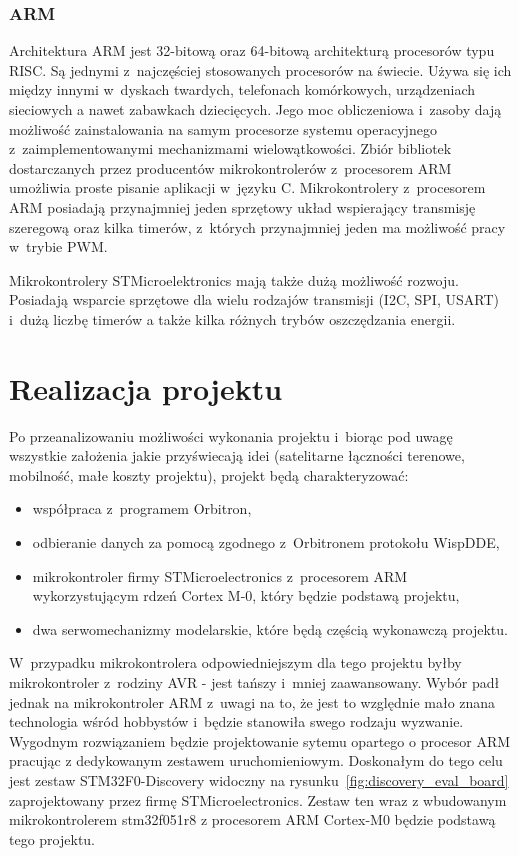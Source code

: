 \documentclass[eng,oneside]{mgr}
\begin{document}
			\subsection{ARM}
			Architektura ARM jest 32-bitową oraz 64-bitową architekturą procesorów typu RISC. Są jednymi z~najczęściej stosowanych procesorów na świecie. Używa się ich między innymi w~dyskach twardych, telefonach komórkowych, urządzeniach sieciowych a nawet zabawkach dziecięcych. Jego moc obliczeniowa i~zasoby dają możliwość zainstalowania na samym procesorze systemu operacyjnego z~zaimplementowanymi mechanizmami wielowątkowości. Zbiór bibliotek dostarczanych przez producentów mikrokontrolerów z~procesorem ARM umożliwia proste pisanie aplikacji w~języku C. Mikrokontrolery z~procesorem ARM posiadają przynajmniej jeden sprzętowy układ wspierający transmisję szeregową oraz kilka timerów, z~których przynajmniej jeden ma możliwość pracy w~trybie PWM.

			Mikrokontrolery STMicroelektronics mają także dużą możliwość rozwoju. Posiadają wsparcie sprzętowe dla wielu rodzajów transmisji (I2C, SPI, USART) i~dużą liczbę timerów a także kilka różnych trybów oszczędzania energii.

	\chapter{Realizacja projektu}
	\label{sec:project_realization}
	Po przeanalizowaniu możliwości wykonania projektu i~biorąc pod uwagę wszystkie założenia jakie przyświecają idei (satelitarne łączności terenowe, mobilność, małe koszty projektu), projekt będą charakteryzować:
	\begin{itemize}
		\item współpraca z~programem Orbitron,
		\item odbieranie danych za pomocą zgodnego z~Orbitronem protokołu WispDDE,
		\item mikrokontroler firmy STMicroelectronics z~procesorem ARM wykorzystującym rdzeń Cortex M-0, który będzie podstawą projektu,
		\item dwa serwomechanizmy modelarskie, które będą częścią wykonawczą projektu.
	\end{itemize}

	W~przypadku mikrokontrolera odpowiedniejszym dla tego projektu byłby mikrokontroler z~rodziny AVR - jest tańszy i~mniej zaawansowany. Wybór padł jednak na mikrokontroler ARM z~uwagi na to, że jest to względnie mało znana technologia wśród hobbystów i~będzie stanowiła swego rodzaju wyzwanie. Wygodnym rozwiązaniem będzie projektowanie sytemu opartego o procesor ARM pracując z dedykowanym zestawem uruchomieniowym. Doskonałym do tego celu jest zestaw STM32F0-Discovery widoczny na rysunku~\ref{fig:discovery_eval_board} zaprojektowany przez firmę STMicroelectronics. Zestaw ten wraz z wbudowanym mikrokontrolerem stm32f051r8 z procesorem ARM Cortex-M0 będzie podstawą tego projektu.
	
\end{document}
